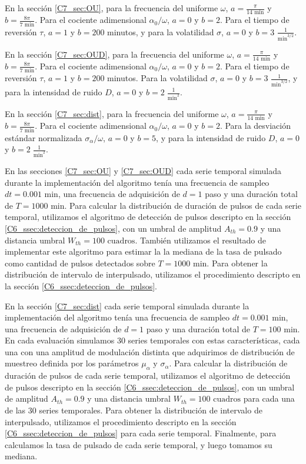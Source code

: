 \documentclass[./main.tex]{subfiles}
\begin{document}
\begin{subappendices}
En la sección \ref{C7_sec:OU}, para la frecuencia del uniforme $\omega$, $a = \frac{\pi}{14 \text{ min}}$ y $b = \frac{8\pi}{7 \text{ min}}$. Para el cociente adimensional $\alpha_0/\omega$, $a = 0$ y $b = 2$. Para el tiempo de reversión $\tau$, $a = 1$ y $b = 200$ minutos, y para la volatilidad $\sigma$, $a = 0$ y $b = 3$ $\frac{1}{\text{min}^{3/2}}$. 

En la sección \ref{C7_sec:OUD}, para la frecuencia del uniforme $\omega$, $a = \frac{\pi}{14 \text{ min}}$ y $b = \frac{8\pi}{7 \text{ min}}$. Para el cociente adimensional $\alpha_0/\omega$, $a = 0$ y $b = 2$. Para el tiempo de reversión $\tau$, $a = 1$ y $b = 200$ minutos. Para la volatilidad $\sigma$, $a = 0$ y $b = 3$ $\frac{1}{\text{min}^{3/2}}$, y para la intensidad de ruido $D$, $a = 0$ y $b = 2\;\frac{1}{\text{min}^2}$.

En la sección \ref{C7_sec:dist}, para la frecuencia del uniforme $\omega$, $a = \frac{\pi}{14 \text{ min}}$ y $b = \frac{8\pi}{7 \text{ min}}$. Para el cociente adimensional $\alpha_0/\omega$, $a = 0$ y $b = 2$. Para la desviación estándar normalizada $\sigma_{\alpha}/\omega$, $a = 0$ y $b = 5$, y para la intensidad de ruido $D$, $a = 0$ y $b = 2\;\frac{1}{\text{min}^2}$.


En las secciones \ref{C7_sec:OU} y \ref{C7_sec:OUD} cada serie temporal simulada durante la implementación del algoritmo tenía una frecuencia de sampleo $dt = 0.001 \text{ min}$, una frecuencia de adquisición de $d = 1$ paso y una duración total de $T = 1000 \text{ min}$. Para calcular la distribución de duración de pulsos de cada serie temporal, utilizamos el algoritmo de detección de pulsos descripto en la sección \ref{C6_ssec:deteccion_de_pulsos}, con un umbral de amplitud $A_{th} = 0.9$ y una distancia umbral $W_{th} = 100 \text{ cuadros}$. También utilizamos el resultado de implementar este algoritmo para estimar la la mediana de la tasa de pulsado como cantidad de pulsos detectados sobre $T = 1000 \text{ min}$. Para obtener la distribución de intervalo de interpulsado, utilizamos el procedimiento descripto en la sección \ref{C6_ssec:deteccion_de_pulsos}.  


En la sección \ref{C7_sec:dist} cada serie temporal simulada durante la implementación del algoritmo tenía una frecuencia de sampleo $dt = 0.001 \text{ min}$, una frecuencia de adquisición de $d = 1$ paso y una duración total de $T = 100 \text{ min}$. En cada evaluación simulamos $30$ series temporales con estas características, cada una con una amplitud de modulación distinta que adquirimos de distribución de muestreo definida por los parámetros $\mu_{\alpha}$ y $\sigma_{\alpha}$. Para calcular la distribución de duración de pulsos de cada serie temporal, utilizamos el algoritmo de detección de pulsos descripto en la sección \ref{C6_ssec:deteccion_de_pulsos}, con un umbral de amplitud $A_{th} = 0.9$ y una distancia umbral $W_{th} = 100 \text{ cuadros}$ para cada una de las 30 series temporales.  Para obtener la distribución de intervalo de interpulsado,  utilizamos el procedimiento descripto en la sección \ref{C6_ssec:deteccion_de_pulsos} para cada serie temporal. Finalmente, para calculamos la tasa de pulsado de cada serie temporal, y luego tomamos su mediana. 



\end{subappendices}
\end{document}
